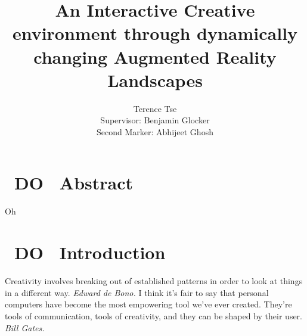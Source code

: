 \documentclass[11pt]{article}
\begin{document}
\title{An Interactive Creative environment through dynamically 
changing Augmented Reality Landscapes}
\author{Terence Tse \\
		Supervisor: Benjamin Glocker\\
		Second Marker: Abhijeet Ghosh}
\maketitle
\newpage
\tableofcontents
\newpage
\section{~DO~ Abstract}
Oh
\newpage

\section{~DO~ Introduction}
\begin{center}
Creativity involves breaking out of established patterns in
		order to look at things in a different way. \textit{Edward de Bono.}
I think it's fair to say that personal computers have become
		the most empowering tool we've ever created. They're tools of
		communication, tools of creativity, and they can be shaped by
		their user. \textit{Bill Gates.}		
\end{center}
\end{document}
